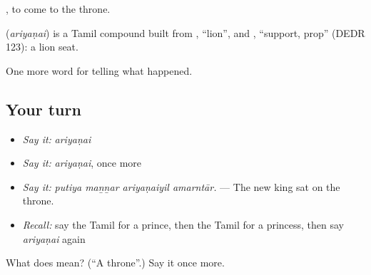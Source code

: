  , to come to the throne.

\begin{cousinweb}
\textbf{} (\emph{ariyaṇai}) is a Tamil compound built from , \textquotedblleft{}lion\textquotedblright{}, and , \textquotedblleft{}support, prop\textquotedblright{} (DEDR 123): a lion seat.
\end{cousinweb}

\begin{grammarlens}[title={What you've built}]
One more word for telling what happened.
\end{grammarlens}

\subsection*{Your turn}
\begin{itemize}
\raggedright
  \item \emph{Say it:} \emph{ariyaṇai}
  \item \emph{Say it:} \emph{ariyaṇai}, once more
  \item \emph{Say it:} \emph{putiya maṉṉar ariyaṇaiyil amarntār.} — The new king sat on the throne.
  \item \emph{Recall:} say the Tamil for a prince, then the Tamil for a princess, then say \emph{ariyaṇai} again
\end{itemize}

\begin{tcolorbox}[breakable,colback=teal!4,colframe=teal!35!black,title={Before you move on}]
What does  mean? (\textquotedblleft{}A throne\textquotedblright{}.) Say it once more.
\end{tcolorbox}

